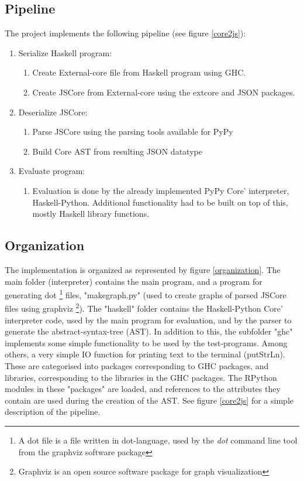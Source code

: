 \subsection{Pipeline}

The project implements the following pipeline (see figure \ref{core2js}):
\begin{enumerate}
\item Serialize Haskell program: 
  \begin{enumerate}
  \item Create External-core file from Haskell program using GHC.
  \item Create JSCore from External-core using the extcore and JSON packages.
  \end{enumerate}
\item Deserialize JSCore:
  \begin{enumerate}
  \item Parse JSCore using the parsing tools available for PyPy
  \item Build Core AST from resulting JSON datatype
  \end{enumerate}
\item Evaluate program:
  \begin{enumerate}
  \item Evaluation is done by the already implemented PyPy Core' interpreter,
  Haskell-Python. Additional functionality had to be built on top of this, mostly 
  Haskell library functions.
  \end {enumerate}
\end{enumerate}

\subsection{Organization}

The implementation is organized as represented by figure \ref{organization}. The
main folder (interpreter) contains the main program, and a program for generating
dot
\footnote{ A dot file is a file written in dot-language, used by the \emph{dot} command
line tool from the graphviz software package}
files, "makegraph.py" (used to create graphs of parsed JSCore files using graphviz
\footnote{ Graphviz is an open source software package for graph visualization}). 
The "haskell" folder
contains the Haskell-Python Core' interpreter code, used by the main program for evaluation, 
and by the parser to generate the abstract-syntax-tree (AST). In addition to this,
the subfolder "ghc" implements some simple functionality to be used by the test-programs.
Among others, a very simple IO function for printing text to the terminal (putStrLn).
These are categorised into packages corresponding to GHC packages, and libraries, 
corresponding to the libraries in the GHC packages.
The RPython modules in these "packages" are loaded, and references to the attributes
they contain are used during
the creation of the AST. See figure \ref{core2js} for a simple description of the pipeline.

